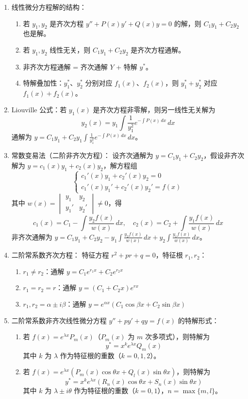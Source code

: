 \documentclass[UTF8]{ctexart}
\theoremstyle{remark}
\begin{document}
\begin{enumerate}
\item 线性微分方程解的结构：  
\begin{enumerate}
	\item 若 \(y_1, y_2\) 是齐次方程 \(y'' + P(x)y' + Q(x)y = 0\) 的解，则 \(C_1y_1 + C_2y_2\) 也是解。  
	\item 若 \(y_1, y_2\) 线性无关，则 \(C_1y_1 + C_2y_2\) 是齐次方程通解。  
	\item 非齐次方程通解 = 齐次通解 \(Y\) + 特解 \(y^*\)。  
	\item 特解叠加性：\(y_1^*\)、\(y_2^*\) 分别对应 \(f_1(x)\)、\(f_2(x)\)，则 \(y_1^* + y_2^*\) 对应 \(f_1(x) + f_2(x)\)。  
\end{enumerate}  

\item Liouville 公式：若 \(y_1(x)\) 是齐次方程非零解，则另一线性无关解为  
\[
y_2(x) = y_1 \int \frac{1}{y_1^2} e^{-\int P(x) \, dx} \, dx
\]  
通解为 \(y = C_1y_1 + C_2y_1 \int \frac{1}{y_1^2} e^{-\int P(x) \, dx} \, dx\)。  

\item 常数变易法（二阶非齐次方程）：  
设齐次通解为 \(y = C_1y_1 + C_2y_2\)，假设非齐次解为 \(y = c_1(x)y_1 + c_2(x)y_2\)，解方程组  
\[
\begin{cases}
	c_1'(x)y_1 + c_2'(x)y_2 = 0 \\
	c_1'(x)y_1' + c_2'(x)y_2' = f(x)
\end{cases}
\]  
其中 \(w(x) = \begin{vmatrix} y_1 & y_2 \\ y_1' & y_2' \end{vmatrix} \neq 0\)，得  
\[
c_1(x) = C_1 - \int \frac{y_2 f(x)}{w(x)} \, dx, \quad c_2(x) = C_2 + \int \frac{y_1 f(x)}{w(x)} \, dx
\]  
非齐次通解为 \(y = C_1y_1 + C_2y_2 - y_1 \int \frac{y_2 f(x)}{w(x)} \, dx + y_2 \int \frac{y_1 f(x)}{w(x)} \, dx\)。  

\item 二阶常系数齐次方程：  
特征方程 \(r^2 + pr + q = 0\)，特征根 \(r_1, r_2\)：  
\begin{enumerate}
	\item \(r_1 \neq r_2\)：通解 \(y = C_1 e^{r_1 x} + C_2 e^{r_2 x}\)  
	\item \(r_1 = r_2 = r\)：通解 \(y = (C_1 + C_2 x) e^{r x}\)  
	\item \(r_1, r_2 = \alpha \pm i\beta\)：通解 \(y = e^{\alpha x}(C_1 \cos\beta x + C_2 \sin\beta x)\)  
\end{enumerate}
\item 二阶常系数非齐次线性微分方程 \(y'' + py' + qy = f(x)\) 的特解形式：  
\begin{enumerate}
	\item 若 \(f(x) = e^{\lambda x} P_m(x)\)（\(P_m(x)\) 为 \(m\) 次多项式），则特解为  
	\[
	y^* = x^k e^{\lambda x} Q_m(x)
	\]  
	其中 \(k\) 为 \(\lambda\) 作为特征根的重数（\(k=0,1,2\)）。  
	\item 若 \(f(x) = e^{\lambda x}(P_m(x)\cos\theta x + Q_l(x)\sin\theta x)\)，则特解为  
	\[
	y^* = x^k e^{\lambda x}(R_n(x)\cos\theta x + S_n(x)\sin\theta x)
	\]  
	其中 \(k\) 为 \(\lambda \pm i\theta\) 作为特征根的重数（\(k=0,1\)），\(n = \max\{m, l\}\)。  
\end{enumerate}  


\end{enumerate}
\end{document}
